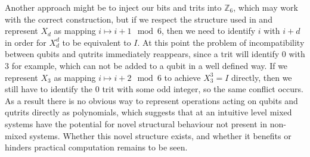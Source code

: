 Another approach might be to inject our bits and trits into $\mathbb{Z}_6$, which may work with the correct construction, but if we respect the structure used in \cite{arithmetics} and represent $X_d$ as mapping $i \mapsto i+1 \mod 6$, then we need to identify $i$ with $i+d$ in order for $X_d^d$ to be equivalent to $I$. At this point the problem of incompatibility between  qubits and qutrits immediately reappears, since a trit will identify 0 with 3 for example, which can not be added to a qubit in a well defined way. If we represent $X_3$ as mapping $i \mapsto i+2\mod 6$ to achieve $X_3^3=I$ directly, then we still have to identify the 0 trit with some odd integer, so the same conflict occurs. As a result there is no obvious way to represent operations acting on qubits and qutrits directly as polynomials, which suggests that at an intuitive level mixed systems have the potential for novel structural behaviour not present in non-mixed systems. Whether this novel structure  exists, and whether it benefits or hinders practical computation remains to be seen.